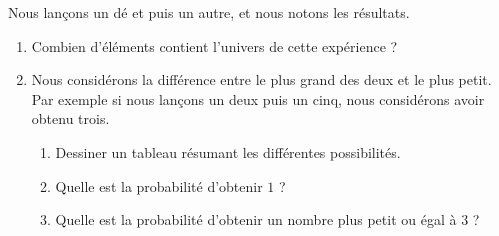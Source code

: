 
\begin{exercice}\label{exosmath-0357}

    Nous lançons un dé et puis un autre, et nous notons les résultats.
    \begin{enumerate}
        \item
            Combien d'éléments contient l'univers de cette expérience ?
        \item
            Nous considérons la différence entre le plus grand des deux et le plus petit. Par exemple si nous lançons un deux puis un cinq, nous considérons avoir obtenu trois. 
            
            \begin{enumerate}
                \item 
            Dessiner un tableau résumant les différentes possibilités.
                \item
                   Quelle est la probabilité d'obtenir \( 1\) ?
                \item
                    Quelle est la probabilité d'obtenir un nombre plus petit ou égal à \( 3\) ?
            \end{enumerate}
    \end{enumerate}

\end{exercice}
